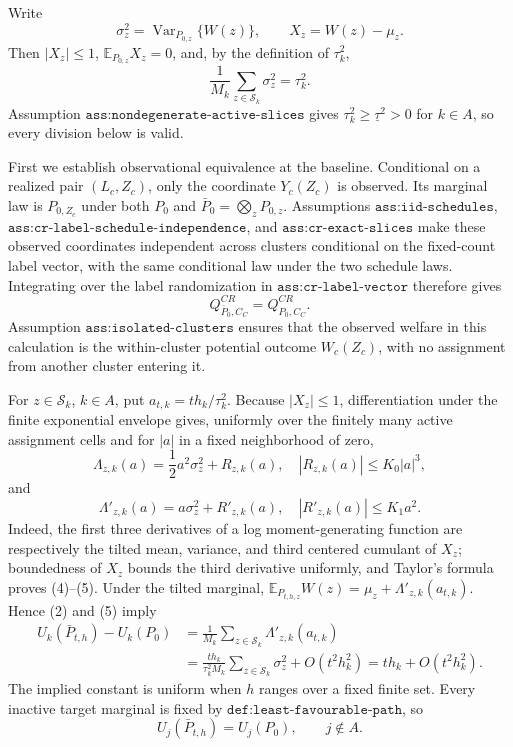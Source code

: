 Write
\[
\sigma_z^2=\operatorname{Var}_{P_{0,z}}\{W(z)\},
\qquad X_z=W(z)-\mu_z.
\tag{1}
\]
Then \(|X_z|\leq1\), \(\mathbb E_{P_{0,z}}X_z=0\), and, by the definition of \(\tau_k^2\),
\[
\frac1{M_k}\sum_{z\in\mathcal S_k}\sigma_z^2=\tau_k^2.
\tag{2}
\]
Assumption \(\texttt{ass:nondegenerate-active-slices}\) gives \(\tau_k^2\geq\underline\tau^2>0\) for \(k\in A\), so every division below is valid.

First we establish observational equivalence at the baseline.  Conditional on a realized pair \((L_c,Z_c)\), only the coordinate \(Y_c(Z_c)\) is observed.  Its marginal law is \(P_{0,Z_c}\) under both \(P_0\) and \(\bar P_0=\bigotimes_zP_{0,z}\).  Assumptions \(\texttt{ass:iid-schedules}\), \(\texttt{ass:cr-label-schedule-independence}\), and \(\texttt{ass:cr-exact-slices}\) make these observed coordinates independent across clusters conditional on the fixed-count label vector, with the same conditional law under the two schedule laws.  Integrating over the label randomization in \(\texttt{ass:cr-label-vector}\) therefore gives
\[
Q^{CR}_{\bar P_0,C_C}=Q^{CR}_{P_0,C_C}.
\tag{3}
\]
Assumption \(\texttt{ass:isolated-clusters}\) ensures that the observed welfare in this calculation is the within-cluster potential outcome \(W_c(Z_c)\), with no assignment from another cluster entering it.

For \(z\in\mathcal S_k\), \(k\in A\), put \(a_{t,k}=t h_k/\tau_k^2\).  Because \(|X_z|\leq1\), differentiation under the finite exponential envelope gives, uniformly over the finitely many active assignment cells and for \(|a|\) in a fixed neighborhood of zero,
\[
\Lambda_{z,k}(a)=\frac12a^2\sigma_z^2+R_{z,k}(a),
\quad |R_{z,k}(a)|\leq K_0|a|^3,
\tag{4}
\]
and
\[
\Lambda'_{z,k}(a)=a\sigma_z^2+R'_{z,k}(a),
\quad |R'_{z,k}(a)|\leq K_1a^2.
\tag{5}
\]
Indeed, the first three derivatives of a log moment-generating function are respectively the tilted mean, variance, and third centered cumulant of \(X_z\); boundedness of \(X_z\) bounds the third derivative uniformly, and Taylor's formula proves (4)--(5).  Under the tilted marginal, \(\mathbb E_{P_{t,h,z}}W(z)=\mu_z+\Lambda'_{z,k}(a_{t,k})\).  Hence (2) and (5) imply
\[
\begin{split}
U_k(\bar P_{t,h})-U_k(P_0)
&=\frac1{M_k}\sum_{z\in\mathcal S_k}\Lambda'_{z,k}(a_{t,k})\\
&=\frac{t h_k}{\tau_k^2M_k}\sum_{z\in\mathcal S_k}\sigma_z^2+O(t^2h_k^2)
=t h_k+O(t^2h_k^2).
\end{split}
\tag{6}
\]
The implied constant is uniform when \(h\) ranges over a fixed finite set.  Every inactive target marginal is fixed by \(\texttt{def:least-favourable-path}\), so
\[
U_j(\bar P_{t,h})=U_j(P_0),\qquad j\notin A.
\tag{7}
\]


